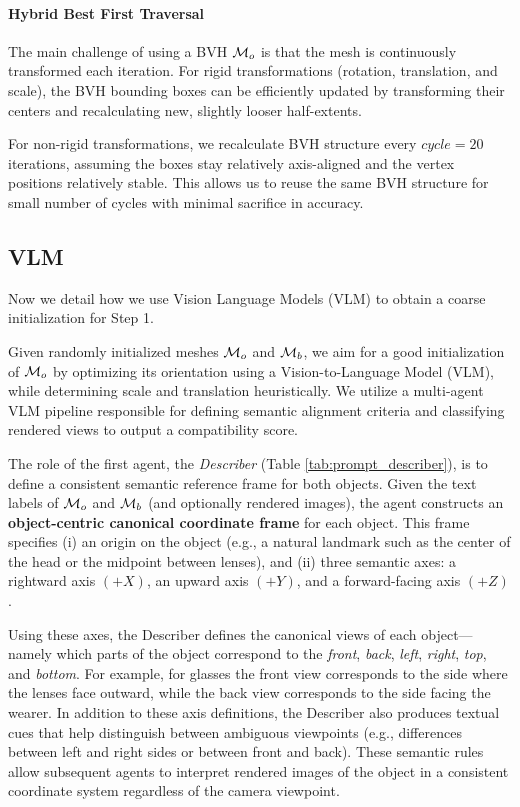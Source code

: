 \paragraph{Hybrid Best First Traversal}
The main challenge of using a BVH $\mathcal{M}_o$ is that the mesh is continuously transformed each iteration. For rigid transformations (rotation, translation, and scale), the BVH bounding boxes can be efficiently updated by transforming their centers and recalculating new, slightly looser half-extents.


For non-rigid transformations, we recalculate BVH structure every $cycle=20$ iterations, assuming the boxes stay relatively axis-aligned and the vertex positions relatively stable. This allows us to reuse the same BVH structure for small number of cycles with minimal sacrifice in accuracy.


\subsection{VLM}
\label{subsec:vlm}

Now we detail how we use Vision Language Models (VLM) to obtain a coarse initialization for Step 1.

Given randomly initialized meshes $\mathcal{M}_o$ and $\mathcal{M}_b$, we aim for a good initialization of $\mathcal{M}_o$ by optimizing its orientation using a Vision-to-Language Model (VLM), while determining scale and translation heuristically. We utilize a multi-agent VLM pipeline responsible for defining semantic alignment criteria and classifying rendered views to output a compatibility score. 

The role of the first agent, the \textit{Describer} (Table \ref{tab:prompt_describer}), is to define a consistent semantic reference frame for both objects. Given the text labels of $\mathcal{M}_o$ and $\mathcal{M}_b$ (and optionally rendered images), the agent constructs an \textbf{object-centric canonical coordinate frame} for each object. This frame specifies (i) an origin on the object (e.g., a natural landmark such as the center of the head or the midpoint between lenses), and (ii) three semantic axes: a rightward axis $(+X)$, an upward axis $(+Y)$, and a forward-facing axis $(+Z)$. 

Using these axes, the Describer defines the canonical views of each object—namely which parts of the object correspond to the \emph{front}, \emph{back}, \emph{left}, \emph{right}, \emph{top}, and \emph{bottom}. For example, for glasses the front view corresponds to the side where the lenses face outward, while the back view corresponds to the side facing the wearer. In addition to these axis definitions, the Describer also produces textual cues that help distinguish between ambiguous viewpoints (e.g., differences between left and right sides or between front and back). These semantic rules allow subsequent agents to interpret rendered images of the object in a consistent coordinate system regardless of the camera viewpoint.

